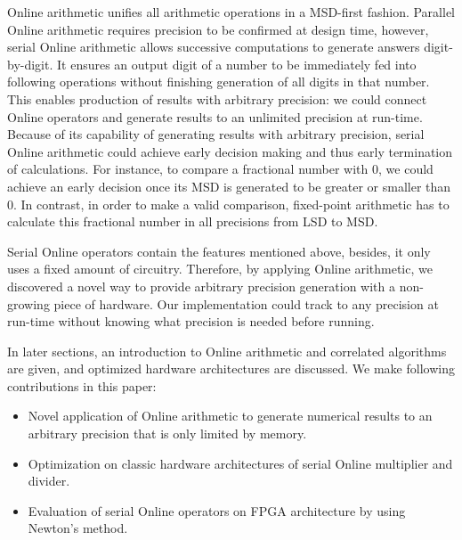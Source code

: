 \documentclass{sig-alternate}
\begin{document}
	Online arithmetic unifies all arithmetic operations in a MSD-first fashion. Parallel Online arithmetic requires precision to be confirmed at design time, however, serial Online arithmetic allows successive computations to generate answers digit-by-digit. 
	It ensures an output digit of a number to be immediately fed into following operations without finishing generation of all digits in that number. 
	This enables production of results with arbitrary precision: we could connect Online operators and generate results to an unlimited precision at run-time. 
	Because of its capability of generating results with arbitrary precision, serial Online arithmetic could achieve early decision making and thus early termination of calculations. 
	For instance, to compare a fractional number with $0$, we could achieve an early decision once its MSD is generated to be greater or smaller than $0$. In contrast, in order to make a valid comparison, fixed-point arithmetic has to calculate this fractional number in all precisions from LSD to MSD.
	
	Serial Online operators contain the features mentioned above, besides, it only uses a fixed amount of circuitry. Therefore, by applying Online arithmetic, we discovered a novel way to provide arbitrary precision generation with a non-growing piece of hardware. Our implementation could track to any precision at run-time without knowing what precision is needed before running.   
			
	In later sections, an introduction to Online arithmetic and correlated algorithms are given, and optimized hardware architectures are discussed.	
	We make following contributions in this paper:
	\vspace{-5pt}
	\begin{itemize}
		\setlength{\itemsep}{-5pt}
		\item Novel application of Online arithmetic to generate numerical results to an arbitrary precision that is only limited by memory. 
		\item Optimization on classic hardware architectures of serial Online multiplier and divider.
		\item Evaluation of serial Online operators on FPGA architecture by using Newton's method.   
	\end{itemize}
	\vspace{-12pt}
\end{document}
